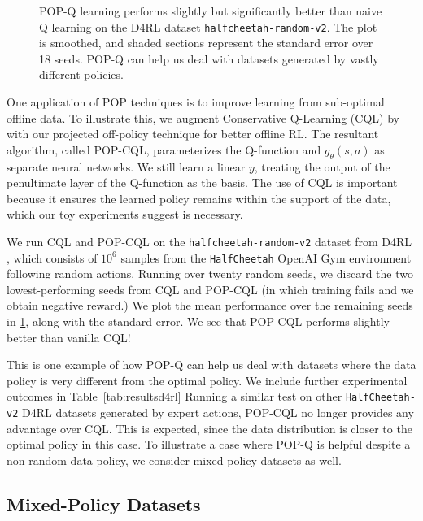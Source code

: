 \begin{figure}[t]
  \centering
  
  \caption{
    POP-Q learning performs slightly but significantly better than naive Q learning on the D4RL dataset \texttt{halfcheetah-random-v2}. The plot is smoothed, and shaded sections represent the standard error over 18 seeds. POP-Q can help us deal with datasets generated by vastly different policies.}
  \label{fig:d4rl}
\end{figure}


One application of POP techniques is to improve learning from sub-optimal offline data. To illustrate this, we augment Conservative Q-Learning (CQL) by \citet{kumar2020cql} with our projected off-policy technique for better offline RL. The resultant algorithm, called POP-CQL, parameterizes the Q-function and $g_\theta(s, a)$ as separate neural networks. We still learn a linear $y$, treating the output of the penultimate layer of the Q-function as the basis. The use of CQL is important because it ensures the learned policy remains within the support of the data, which our toy experiments suggest is necessary.

We run CQL and POP-CQL on the \texttt{halfcheetah-random-v2} dataset from D4RL \citep{fu2020d4rl}, which consists of $10^6$ samples from the \texttt{HalfCheetah} OpenAI Gym \citep{openaigym} environment following random actions. Running over twenty random seeds, we discard the two lowest-performing seeds from CQL and POP-CQL (in which training fails and we obtain negative reward.) We plot the mean performance over the remaining seeds in \cref{fig:d4rl}, along with the standard error. We see that POP-CQL performs slightly better than vanilla CQL!

This is one example of how POP-Q can help us deal with datasets where the data policy is very different from the optimal policy. We include further experimental outcomes in Table~\ref{tab:resultsd4rl}
Running a similar test on other \texttt{HalfCheetah-v2} D4RL datasets generated by expert actions, POP-CQL no longer provides any advantage over CQL. This is expected, since the data distribution is closer to the optimal policy in this case. To illustrate a case where POP-Q is helpful despite a non-random data policy, we consider mixed-policy datasets as well.

\subsection{Mixed-Policy Datasets}

